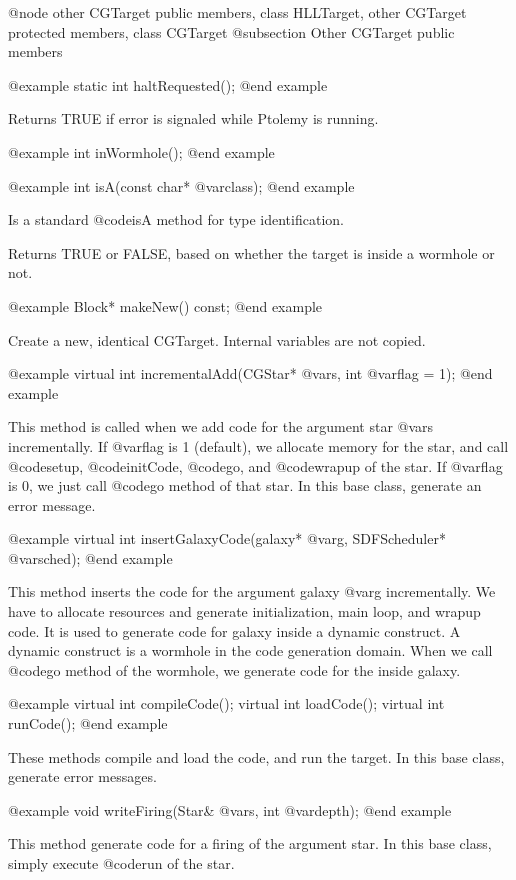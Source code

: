 @node other CGTarget public members, class HLLTarget, other CGTarget protected members, class CGTarget
@subsection Other CGTarget public members

@example
static int haltRequested();
@end example

Returns TRUE if error is signaled while Ptolemy is running.

@example
int inWormhole();
@end example

@example
int isA(const char* @var{class});
@end example

Is a standard @code{isA} method for type identification.

Returns TRUE or FALSE, based on whether the target is inside a wormhole or not.

@example
Block* makeNew() const;
@end example

Create a new, identical CGTarget. Internal variables are not copied.

@example
virtual int incrementalAdd(CGStar* @var{s}, int @var{flag} = 1);
@end example

This method is called when we add code for the argument star @var{s}
incrementally. If @var{flag} is 1 (default), we allocate memory for the star, 
and call @code{setup}, @code{initCode}, @code{go}, and @code{wrapup} of
the star. If @var{flag} is 0, we just call @code{go} method of that star.
In this base class, generate an error
message.

@example
virtual int insertGalaxyCode(galaxy* @var{g}, SDFScheduler* @var{sched});
@end example

This method inserts the code for the argument galaxy @var{g} incrementally.
We have to allocate resources and generate initialization, main loop, and
wrapup code. It is used to generate code for galaxy inside a dynamic
construct. A dynamic construct is a wormhole in the code generation domain.
When we call @code{go} method of the wormhole, we generate code
for the inside galaxy. 

@example
virtual int compileCode();
virtual int loadCode();
virtual int runCode();
@end example

These methods compile and load the code, and run the target. In this base
class, generate error messages.

@example
void writeFiring(Star& @var{s}, int @var{depth});
@end example

This method generate code for a firing of the argument star. In this base
class, simply execute @code{run} of the star.

